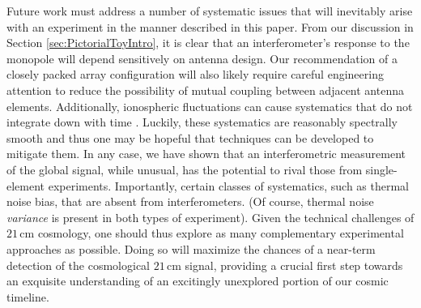 \documentclass[twocolumn,apj,numberedappendix]{emulateapj}
\newcommand{\acl}[1]{}
\begin{document}
\acl{Added line about antenna design} Future work must address a number of systematic issues that will inevitably arise with an experiment in the manner described in this paper. From our discussion in Section \ref{sec:PictorialToyIntro}, it is clear that an interferometer's response to the monopole will depend sensitively on antenna design. Our recommendation of a closely packed array configuration will also likely require careful engineering attention to reduce the possibility of mutual coupling between adjacent antenna elements. Additionally, ionospheric fluctuations can cause systematics that do not integrate down with time \citep{DattaIonosphere}. Luckily, these systematics are reasonably spectrally smooth and thus one may be hopeful that techniques can be developed to mitigate them. In any case, we have shown that an interferometric measurement of the global signal, while unusual, has the potential to rival those from single-element experiments. Importantly, certain classes of systematics, such as thermal noise bias, that are absent from interferometers. (Of course, thermal noise \emph{variance} is present in both types of experiment). Given the technical challenges of $21\,\textrm{cm}$ cosmology, one should thus explore as many complementary experimental approaches as possible. Doing so will maximize the chances of a near-term detection of the cosmological $21\,\textrm{cm}$ signal, providing a crucial first step towards an exquisite understanding of an excitingly unexplored portion of our cosmic timeline.
\end{document}
